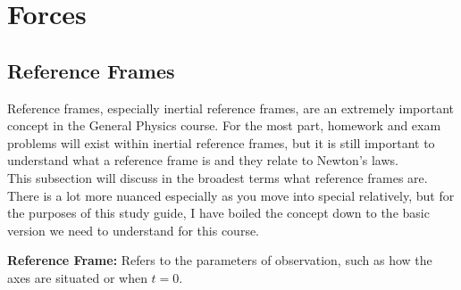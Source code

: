 \section{Forces}
\subsection{Reference Frames}
Reference frames, especially inertial reference frames, are an extremely important concept in the General Physics course. For the most part, homework 
and exam problems will exist within inertial reference frames, but it is still important to understand what a reference frame is and they relate to 
Newton's laws. \\

\noindent This subsection will discuss in the broadest terms what reference frames are. There is a lot more nuanced especially as you move into special 
relatively, but for the purposes of this study guide, I have boiled the concept down to the basic version we need to understand for this course.

\noindent \textbf{Reference Frame:} Refers to the parameters of observation, such as how the axes are situated or when $t=0$.

